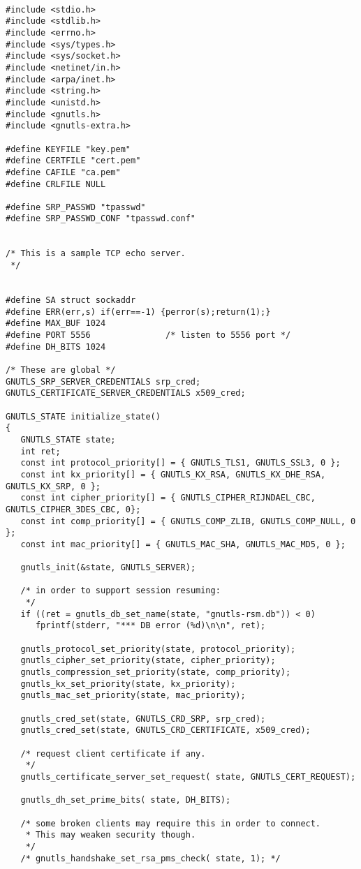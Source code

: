 \begin{verbatim}

#include <stdio.h>
#include <stdlib.h>
#include <errno.h>
#include <sys/types.h>
#include <sys/socket.h>
#include <netinet/in.h>
#include <arpa/inet.h>
#include <string.h>
#include <unistd.h>
#include <gnutls.h>
#include <gnutls-extra.h>

#define KEYFILE "key.pem"
#define CERTFILE "cert.pem"
#define CAFILE "ca.pem"
#define CRLFILE NULL

#define SRP_PASSWD "tpasswd"
#define SRP_PASSWD_CONF "tpasswd.conf"


/* This is a sample TCP echo server.
 */


#define SA struct sockaddr
#define ERR(err,s) if(err==-1) {perror(s);return(1);}
#define MAX_BUF 1024
#define PORT 5556               /* listen to 5556 port */
#define DH_BITS 1024

/* These are global */
GNUTLS_SRP_SERVER_CREDENTIALS srp_cred;
GNUTLS_CERTIFICATE_SERVER_CREDENTIALS x509_cred;

GNUTLS_STATE initialize_state()
{
   GNUTLS_STATE state;
   int ret;
   const int protocol_priority[] = { GNUTLS_TLS1, GNUTLS_SSL3, 0 };
   const int kx_priority[] = { GNUTLS_KX_RSA, GNUTLS_KX_DHE_RSA, GNUTLS_KX_SRP, 0 };
   const int cipher_priority[] = { GNUTLS_CIPHER_RIJNDAEL_CBC, GNUTLS_CIPHER_3DES_CBC, 0};
   const int comp_priority[] = { GNUTLS_COMP_ZLIB, GNUTLS_COMP_NULL, 0 };
   const int mac_priority[] = { GNUTLS_MAC_SHA, GNUTLS_MAC_MD5, 0 };

   gnutls_init(&state, GNUTLS_SERVER);

   /* in order to support session resuming:
    */
   if ((ret = gnutls_db_set_name(state, "gnutls-rsm.db")) < 0)
      fprintf(stderr, "*** DB error (%d)\n\n", ret);

   gnutls_protocol_set_priority(state, protocol_priority);
   gnutls_cipher_set_priority(state, cipher_priority);
   gnutls_compression_set_priority(state, comp_priority);
   gnutls_kx_set_priority(state, kx_priority);
   gnutls_mac_set_priority(state, mac_priority);

   gnutls_cred_set(state, GNUTLS_CRD_SRP, srp_cred);
   gnutls_cred_set(state, GNUTLS_CRD_CERTIFICATE, x509_cred);

   /* request client certificate if any.
    */
   gnutls_certificate_server_set_request( state, GNUTLS_CERT_REQUEST);

   gnutls_dh_set_prime_bits( state, DH_BITS);

   /* some broken clients may require this in order to connect. 
    * This may weaken security though.
    */
   /* gnutls_handshake_set_rsa_pms_check( state, 1); */


\end{verbatim}
